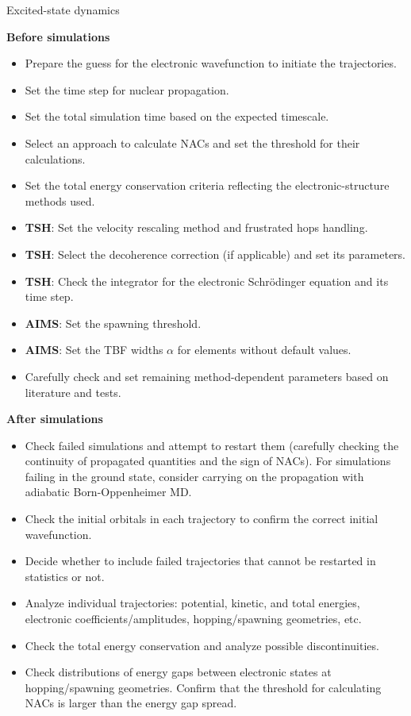 \documentclass[9pt,bestpractices,pubversion]{livecoms}
\begin{document}
\clearpage
\begin{Checklists*}[p!]

\begin{checklist}{Excited-state dynamics}

\textbf{Before simulations}
\begin{itemize}
    \item Prepare the guess for the electronic wavefunction to initiate the trajectories.
    \item Set the time step for nuclear propagation. 
    \item Set the total simulation time based on the expected timescale. 
    \item Select an approach to calculate NACs and set the threshold for their calculations. 
    \item Set the total energy conservation criteria reflecting the electronic-structure methods used. 
    \item \textbf{TSH}: Set the velocity rescaling method and frustrated hops handling.
    \item \textbf{TSH}: Select the decoherence correction (if applicable) and set its parameters.
    \item \textbf{TSH}: Check the integrator for the electronic Schrödinger equation and its time step. 
    \item \textbf{AIMS}: Set the spawning threshold.
    \item \textbf{AIMS}: Set the TBF widths $\alpha$ for elements without default values.
    \item Carefully check and set remaining method-dependent parameters based on literature and tests.
\end{itemize}

\textbf{After simulations}
\begin{itemize}
    \item Check failed simulations and attempt to restart them (carefully checking the continuity of propagated quantities and the sign of NACs). For simulations failing in the ground state, consider carrying on the propagation with adiabatic Born-Oppenheimer MD. 
    \item Check the initial orbitals in each trajectory to confirm the correct initial wavefunction.
    \item Decide whether to include failed trajectories that cannot be restarted in statistics or not.
    \item Analyze individual trajectories: potential, kinetic, and total energies, electronic coefficients/amplitudes, hopping/spawning geometries, etc.
    \item Check the total energy conservation and analyze possible discontinuities.
    \item Check distributions of energy gaps between electronic states at hopping/spawning geometries. Confirm that the threshold for calculating NACs is larger than the energy gap spread.
\end{itemize}


\end{checklist}
\end{Checklists*}
\end{document}
